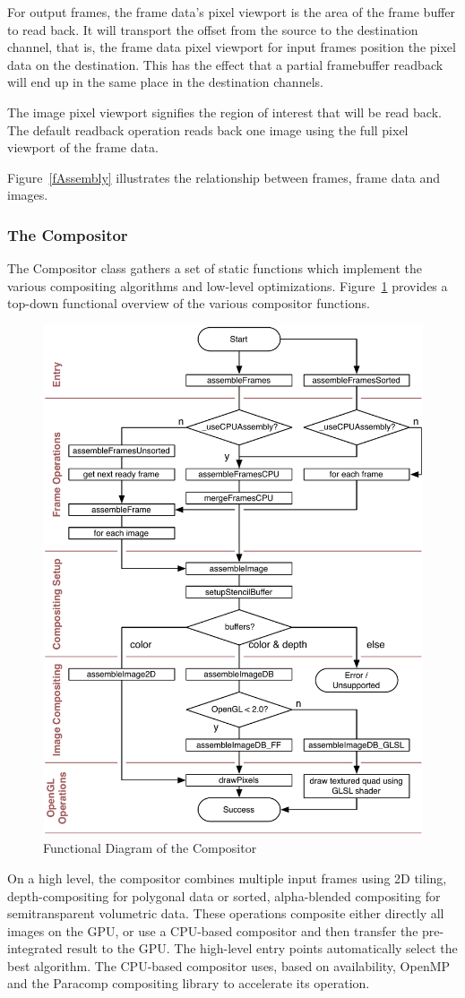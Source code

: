 \documentclass[10pt,a4]{scrartcl}
\newcommand{\fig}[1]{Figure~\ref{#1}}
\begin{document}
For output frames, the frame data's pixel viewport is the area of the
frame buffer to read back. It will transport the offset from the source
to the destination channel, that is, the frame data pixel viewport for
input frames position the pixel data on the destination. This has the
effect that a partial framebuffer readback will end up in the same place
in the destination channels.

The image pixel viewport signifies the region of interest that will be read
back. The default readback operation reads back one image using the full
pixel viewport of the frame data.

\fig{fAssembly} illustrates the relationship between frames, frame data
and images.

\subsubsection{\label{sCompositor}The Compositor}

The \textsf{Compositor} class gathers a set of static functions which
implement the various compositing algorithms and low-level
optimizations. \fig{fCompositor} provides a top-down functional overview
of the various compositor functions.

\begin{figure}
  \includegraphics[width=.618\textwidth]{images/compositor.pdf}
  {\caption{\label{fCompositor}Functional Diagram of the Compositor}}
\end{figure}
On a high level, the compositor combines multiple input frames using 2D
tiling, depth-compositing for polygonal data or sorted, alpha-blended
compositing for semitransparent volumetric data. These operations
composite either directly all images on the GPU, or use a CPU-based
compositor and then transfer the pre-integrated result to the GPU. The
high-level entry points automatically select the best algorithm. The
CPU-based compositor uses, based on availability, OpenMP and the
Paracomp compositing library to accelerate its operation.
\end{document}
